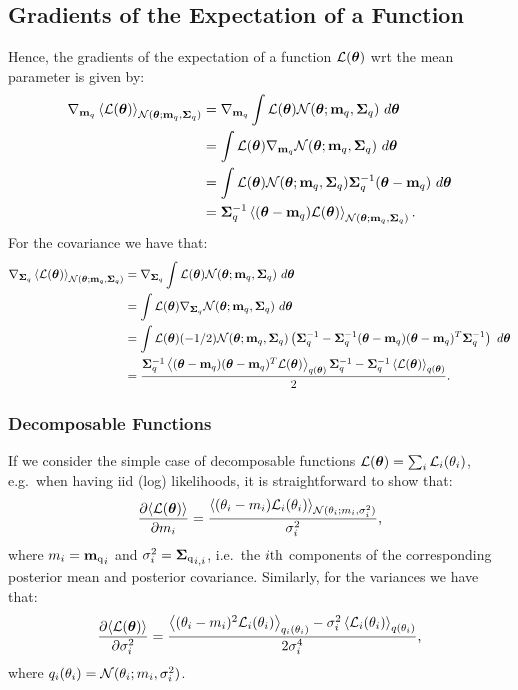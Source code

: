 \subsection{Gradients of the Expectation of a Function \label{sec:gradGaussExp}}
Hence, the gradients of the expectation of a function $\calL(\vectheta)$ wrt the mean parameter is given by:
\begin{align}
	\gradient_{\mq} \Eb{\calL(\vectheta)}_{\Normal(\vectheta; \mq, \Sigmaq)} 
	& = \gradient_{\mq} \int \calL(\vectheta) \Normal(\vectheta; \mq, \Sigmaq) \ d \vectheta \\
	& =  \int \calL(\vectheta) \gradient_{\mq} \Normal(\vectheta; \mq, \Sigmaq) \ d \vectheta \\
	 & =  \int \calL(\vectheta) \Normal(\vectheta; \mq, \Sigmaq)  \Sigmaq^{-1} (\vectheta - \mq) \ d \vectheta \\
	 & = \Sigmaq^{-1} \Eb{ (\vectheta - \mq) \calL(\vectheta) }_{\Normal(\vectheta; \mq, \Sigmaq)} \text{.}
\end{align}
%
For the covariance we have that:
\begin{align}
\gradient_{\Sigmaq} \Eb{\calL(\vectheta)}_{\Normal(\vectheta; \mq, \Sigmaq)} 
&= \gradient_{\Sigmaq} \int \calL(\vectheta) \Normal(\vectheta; \mq, \Sigmaq) \ d \vectheta \\
& = \int  \calL(\vectheta)  \gradient_{\Sigmaq} \Normal(\vectheta; \mq, \Sigmaq) \ d \vectheta \\
& = \int  \calL(\vectheta) (- 1/2) \Normal(\vectheta; \mq, \Sigmaq) \left( \Sigmaq^{-1}  - \Sigmaq^{-1} (\vectheta - \mq) (\vectheta-\mq)^{T} \Sigmaq^{-1}\right) \ d \vectheta \\
&= \frac{       \Sigmaq^{-1} \Eb{(\vectheta - \mq) (\vectheta-\mq)^{T} \calL(\vectheta)}_{q(\vectheta)}  \Sigmaq^{-1}    -  \Sigmaq^{-1}  \Eb{ \calL(\vectheta)}_{q(\vectheta)}  }{2} \text{.}
\end{align}
%
\subsubsection{Decomposable Functions}
If we consider the simple case of decomposable functions $\calL(\vectheta) = \sum_{i} \calL_{i} (\theta_{i})$, e.g.~when having iid (log) likelihoods, it is straightforward to show that:
\begin{align}
	\deriv{ \Eb{\calL(\vectheta)}}{m_{i}} = \frac{ \Eb{(\theta_{i} - m_{i}) \calL_{i}(\theta_{i})}_{\Normal(\theta_{i}; m_{i}, \sigma_{i}^{2})}}{\sigma_{i}^{2}} \text{,}
\end{align}
where $m_{i} = \vecentry{\mq}{i}$ and $\sigma_{i}^{2} = \matentry{\Sigmaq}{i}{i}$, i.e.~the $i\mth$ components of the corresponding posterior mean and posterior covariance.
%
Similarly, for the variances we have that:
\begin{align}
	\deriv{\Eb{\calL(\vectheta)}}{\sigma_{i}^{2}} = 
	\frac{   \Eb{(\theta_{i}-m_{i})^{2} \calL_{i}(\theta_{i}) }_{q_{i}(\theta_{i})}  - \sigma_{i}^{2} \Eb{\calL_{i}(\theta_{i})}_{q(\theta_{i})}   }    {2 \sigma_{i}^{4}} \text{,}
\end{align}
where $q_{i}(\theta_{i}) = \Normal(\theta_{i}; m_{i}, \sigma_{i}^{2})$.


